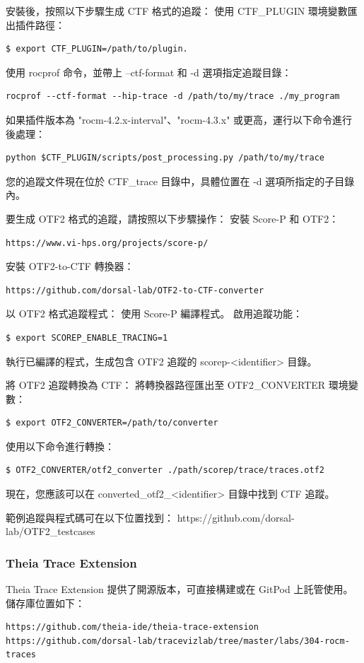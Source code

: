 安裝後，按照以下步驟生成 CTF 格式的追蹤：
使用 CTF\_PLUGIN 環境變數匯出插件路徑：
\begin{lstlisting}
$ export CTF_PLUGIN=∕path∕to∕plugin.
\end{lstlisting}

使用 rocprof 命令，並帶上 --ctf-format 和 -d 選項指定追蹤目錄：
\begin{lstlisting}
rocprof --ctf-format --hip-trace -d /path/to/my/trace ./my_program
\end{lstlisting}

如果插件版本為 "rocm-4.2.x-interval"、"rocm-4.3.x" 或更高，運行以下命令進行後處理：
\begin{lstlisting}
python $CTF_PLUGIN/scripts/post_processing.py /path/to/my/trace
\end{lstlisting}

您的追蹤文件現在位於 CTF\_trace 目錄中，具體位置在 -d 選項所指定的子目錄內。


要生成 OTF2 格式的追蹤，請按照以下步驟操作：
安裝 Score-P 和 OTF2：
\begin{lstlisting}
https://www.vi-hps.org/projects/score-p/
\end{lstlisting}

安裝 OTF2-to-CTF 轉換器：
\begin{lstlisting}
https://github.com/dorsal-lab/OTF2-to-CTF-converter
\end{lstlisting}

以 OTF2 格式追蹤程式：
使用 Score-P 編譯程式。
啟用追蹤功能：
\begin{lstlisting}
$ export SCOREP_ENABLE_TRACING=1
\end{lstlisting}
執行已編譯的程式，生成包含 OTF2 追蹤的 scorep-<identifier> 目錄。

將 OTF2 追蹤轉換為 CTF：
將轉換器路徑匯出至 OTF2\_CONVERTER 環境變數：
\begin{lstlisting}
$ export OTF2_CONVERTER=/path/to/converter
\end{lstlisting}
使用以下命令進行轉換：
\begin{lstlisting}
$ OTF2_CONVERTER/otf2_converter ./path/scorep/trace/traces.otf2
\end{lstlisting}

現在，您應該可以在 converted\_otf2\_<identifier> 目錄中找到 CTF 追蹤。

範例追蹤與程式碼可在以下位置找到：
https://github.com/dorsal-lab/OTF2\_testcases


\subsubsection{Theia Trace Extension}
Theia Trace Extension 提供了開源版本，可直接構建或在 GitPod 上託管使用。儲存庫位置如下：
\begin{lstlisting}
https://github.com/theia-ide/theia-trace-extension
https://github.com/dorsal-lab/tracevizlab/tree/master/labs/304-rocm-traces
\end{lstlisting}

